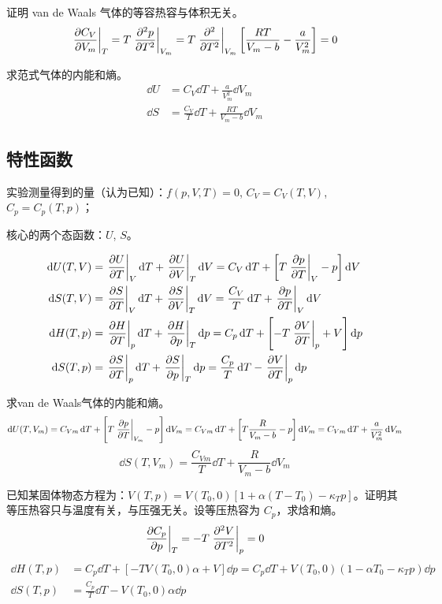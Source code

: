 \begin{framed}
证明 van de Waals 气体的等容热容与体积无关。
\[
\left.\pdv{C_V}{V_m}\right|_T = T \left.\pdv[2]{p}{T}\right|_{V_m} = T \left.\pdv[2]{}{T}\right|_{V_m}\left[\frac{R T}{V_m - b} - \frac{a}{V_m^2}\right] = 0
\]
\end{framed}

\begin{framed}
求范式气体的内能和熵。
\begin{align*}
    \dd{U} & = C_V \dd{T} + \frac{a}{V_m^2} \dd{V_m}\\
    \dd{S} & = \frac{C_V}{T} \dd{T} + \frac{R T}{V_m - b} \dd{V_m}
\end{align*}
\end{framed}

\subsection{特性函数}

实验测量得到的量（认为已知）：$f(p, V, T) = 0$, $C_V = C_V(T, V)$, $C_p = C_p(T, p)$；

核心的两个态函数：$U$, $S$。

\begin{align*}
    \dd{U(T, V)} & = \left.\pdv{U}{T}\right|_V \dd{T} + \left.\pdv{U}{V}\right|_T \dd{V} = C_V \dd{T} + \left[T \left.\pdv{p}{T}\right|_V - p\right] \dd{V}\\
    \dd{S(T, V)} & = \left.\pdv{S}{T}\right|_V \dd{T} + \left.\pdv{S}{V}\right|_T \dd{V} = \frac{C_V}{T} \dd{T} + \left.\pdv{p}{T}\right|_V \dd{V}\\
    \dd{H(T, p)} & = \left.\pdv{H}{T}\right|_p \dd{T} + \left.\pdv{H}{p}\right|_T \dd{p} = C_p \dd{T} + \left[- T \left.\pdv{V}{T}\right|_p + V\right] \dd{p}\\
    \dd{S(T, p)} & = \left.\pdv{S}{T}\right|_p \dd{T} + \left.\pdv{S}{p}\right|_T \dd{p} = \frac{C_p}{T} \dd{T} - \left.\pdv{V}{T}\right|_p \dd{p}
\end{align*}

\begin{framed}
求van de Waals气体的内能和熵。
\[
\dd{U(T, V_m)} = C_{Vm} \dd{T} + \left[T \left.\pdv{p}{T}\right|_{V_m} - p\right] \dd{V_m} = C_{Vm} \dd{T} + \left[T \frac{R}{V_m - b} - p\right] \dd{V_m} = C_{Vm} \dd{T} + \frac{a}{V_m^2} \dd{V_m}
\]\[
\dd{S(T, V_m)} = \frac{C_{Vm}}{T} \dd{T} + \frac{R}{V_m - b} \dd{V_m}
\]
\end{framed}

\begin{framed}
已知某固体物态方程为：$V(T, p) = V(T_0, 0) \left[1 + \alpha (T - T_0) - \kappa_T p\right]$。证明其等压热容只与温度有关，与压强无关。设等压热容为 $C_p$，求焓和熵。
\[
\left.\pdv{C_p}{p}\right|_T = - T \left.\pdv[2]{V}{T}\right|_p = 0
\]
\begin{align*}
    \dd{H(T, p)} & = C_p \dd{T} + \left[- T V(T_0, 0) \alpha + V\right] \dd{p} = C_p \dd{T} + V(T_0, 0) \left(1 - \alpha T_0 - \kappa_T p\right) \dd{p}\\
    \dd{S(T, p)} & = \frac{C_p}{T} \dd{T} - V(T_0, 0) \alpha \dd{p}\\
\end{align*}
\end{framed}

